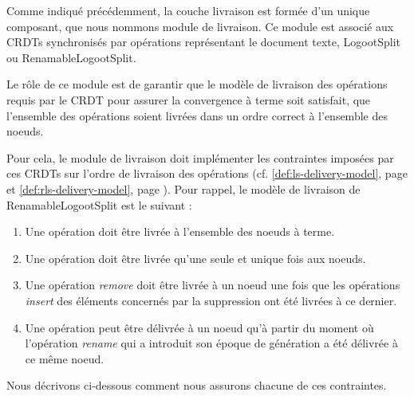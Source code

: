\label{sec:mute-delivery-model}

Comme indiqué précédemment, la couche livraison est formée d'un unique composant, que nous nommons module de livraison.
Ce module est associé aux \acp{CRDT} synchronisés par opérations représentant le document texte, \ie LogootSplit ou RenamableLogootSplit.

Le rôle de ce module est de garantir que le modèle de livraison des opérations requis par le \ac{CRDT} pour assurer la convergence à terme  soit satisfait, \ie que l'ensemble des opérations soient livrées dans un ordre correct à l'ensemble des noeuds.

Pour cela, le module de livraison doit implémenter les contraintes imposées par ces \acp{CRDT} sur l'ordre de livraison des opérations (cf. \autoref{def:ls-delivery-model}, page \pageref{def:ls-delivery-model} et \autoref{def:rls-delivery-model}, page \pageref{def:ls-delivery-model}).
Pour rappel, le modèle de livraison de RenamableLogootSplit est le suivant :
\begin{enumerate}
    \item Une opération doit être livrée à l'ensemble des noeuds à terme.
    \item Une opération doit être livrée qu'une seule et unique fois aux noeuds.
    \item Une opération \emph{remove} doit être livrée à un noeud une fois que les opérations \emph{insert} des éléments concernés par la suppression ont été livrées à ce dernier.
    \item Une opération peut être délivrée à un noeud qu'à partir du moment où l'opération \emph{rename} qui a introduit son époque de génération a été délivrée à ce même noeud.
\end{enumerate}

Nous décrivons ci-dessous comment nous assurons chacune de ces contraintes.
